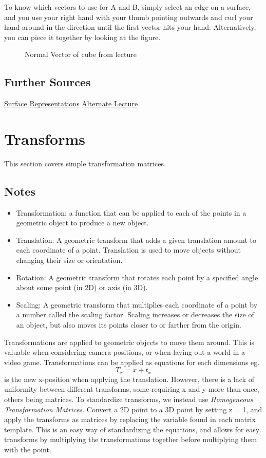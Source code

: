 To know which vectors to use for A and B, simply select an edge on a surface, and you use your right hand with your thumb pointing outwards and curl your hand around in the direction until the first vector hits your hand. Alternatively, you can piece it together by looking at the figure.
  \begin{figure}[!htb]
	\caption{\label{fig:normalCube} Normal Vector of cube from lecture}
\end{figure}

\subsection{Further Sources}
	\href{https://www.tutorialspoint.com/computer_graphics/computer_graphics_surfaces.htm}{Surface Representations}
	\newline
	\href{https://www.cs.cmu.edu/afs/cs/academic/class/15462-s09/www/lec/04/lec04.pdf}{Alternate Lecture}
\newpage
\section{Transforms}
This section covers simple transformation matrices.
\subsection{Notes}
\begin{itemize}
	\item Transformation: a function that can be applied to each of the points in a geometric object to produce a new object.
	\item Translation: A geometric transform that adds a given translation amount to each coordinate of a point. Translation is used to move objects without changing their size or orientation.
	\item Rotation: A geometric transform that rotates each point by a specified angle about some point (in 2D) or axis (in 3D).
	\item Scaling: A geometric transform that multiplies each coordinate of a point by a number called the scaling factor. Scaling increases or decreases the size of an object, but also moves its points closer to or farther from the origin.
\end{itemize}
Transformations are applied to geometric objects to move them around. This is valuable when considering camera positions, or when laying out a world in a video game.
Transformations can be applied as equations for each dimensions eg. \[T_x = x + t_x\] is the new x-position when applying the translation. However, there is a lack of uniformity between different transforms, some requiring x and y more than once, others being matrices. To standardize transforms, we instead use \textit{Homogeneous Transformation Matrices}. Convert a 2D point to a 3D point by setting z = 1, and apply the transforms as matrices by replacing the variable found in each matrix template. This is an easy way of standardizing the equations, and allows for easy transforms by multiplying the transformations together before multiplying them with the point.

